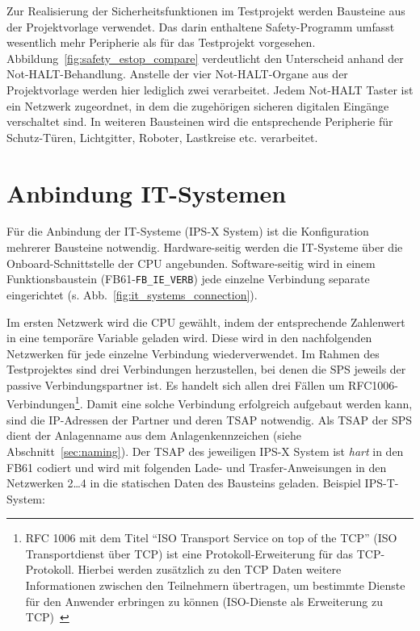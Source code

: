 Zur Realisierung der Sicherheitsfunktionen im Testprojekt werden Bausteine aus der Projektvorlage verwendet. Das darin enthaltene Safety-Programm umfasst wesentlich mehr Peripherie als für das Testprojekt vorgesehen. Abbildung~\ref{fig:safety_estop_compare} verdeutlicht den Unterscheid anhand der Not-HALT-Behandlung. Anstelle der vier Not-HALT-Organe aus der Projektvorlage werden hier lediglich zwei verarbeitet. Jedem Not-HALT Taster ist ein Netzwerk zugeordnet, in dem die zugehörigen sicheren digitalen Eingänge verschaltet sind. In weiteren Bausteinen wird die entsprechende Peripherie für Schutz-Türen, Lichtgitter, Roboter, Lastkreise etc. verarbeitet.  




\section{Anbindung IT-Systemen}

Für die Anbindung der IT-Systeme (IPS-X System) ist die Konfiguration mehrerer Bausteine notwendig. Hardware-seitig werden die IT-Systeme über die Onboard-Schnittstelle der CPU angebunden. Software-seitig wird in einem Funktionsbaustein (FB61-\texttt{FB\_IE\_VERB}) jede einzelne Verbindung separate eingerichtet (s. Abb.~\ref{fig:it_systems_connection}).\par
Im ersten Netzwerk wird die CPU gewählt, indem der entsprechende Zahlenwert in eine temporäre Variable geladen wird. Diese wird in den nachfolgenden Netzwerken für jede einzelne Verbindung wiederverwendet. Im Rahmen des Testprojektes sind drei Verbindungen herzustellen, bei denen die SPS jeweils der passive Verbindungspartner ist. Es handelt sich allen drei Fällen um RFC1006-Verbindungen\footnote{RFC 1006 mit dem Titel ``ISO Transport Service on top of the TCP'' (ISO Transportdienst über TCP) ist eine Protokoll-Erweiterung für das TCP-Protokoll. Hierbei werden zusätzlich zu den TCP Daten weitere Informationen zwischen den Teilnehmern übertragen, um bestimmte Dienste für den Anwender erbringen zu können (ISO-Dienste als Erweiterung zu TCP)~}.
Damit eine solche Verbindung erfolgreich aufgebaut werden kann, sind die IP-Adressen der Partner und deren TSAP notwendig. Als TSAP der SPS dient der Anlagenname aus dem Anlagenkennzeichen (siehe Abschnitt~\ref{sec:naming}). Der TSAP des jeweiligen IPS-X System ist \emph{hart} in den FB61 codiert und wird mit folgenden Lade- und Trasfer-Anweisungen in den Netzwerken 2\ldots4 in die statischen Daten des Bausteins geladen. Beispiel IPS-T-System:\leer


